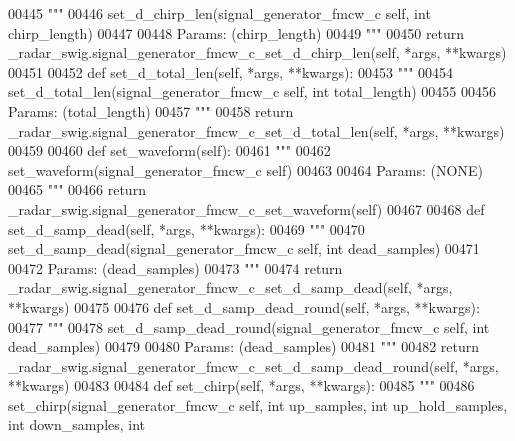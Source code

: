 \begin{DoxyCode}
{{{{00445         \textcolor{stringliteral}{"""}
00446 \textcolor{stringliteral}{        set\_d\_chirp\_len(signal\_generator\_fmcw\_c self, int chirp\_length)}
00447 \textcolor{stringliteral}{}
00448 \textcolor{stringliteral}{        Params: (chirp\_length)}
00449 \textcolor{stringliteral}{        """}
00450         \textcolor{keywordflow}{return} \_radar\_swig.signal\_generator\_fmcw\_c\_set\_d\_chirp\_len(self, *args, **kwargs)
00451 
00452     \textcolor{keyword}{def }set_d_total_len(self, *args, **kwargs):
00453         \textcolor{stringliteral}{"""}
00454 \textcolor{stringliteral}{        set\_d\_total\_len(signal\_generator\_fmcw\_c self, int total\_length)}
00455 \textcolor{stringliteral}{}
00456 \textcolor{stringliteral}{        Params: (total\_length)}
00457 \textcolor{stringliteral}{        """}
00458         \textcolor{keywordflow}{return} \_radar\_swig.signal\_generator\_fmcw\_c\_set\_d\_total\_len(self, *args, **kwargs)
00459 
00460     \textcolor{keyword}{def }set_waveform(self):
00461         \textcolor{stringliteral}{"""}
00462 \textcolor{stringliteral}{        set\_waveform(signal\_generator\_fmcw\_c self)}
00463 \textcolor{stringliteral}{}
00464 \textcolor{stringliteral}{        Params: (NONE)}
00465 \textcolor{stringliteral}{        """}
00466         \textcolor{keywordflow}{return} \_radar\_swig.signal\_generator\_fmcw\_c\_set\_waveform(self)
00467 
00468     \textcolor{keyword}{def }set_d_samp_dead(self, *args, **kwargs):
00469         \textcolor{stringliteral}{"""}
00470 \textcolor{stringliteral}{        set\_d\_samp\_dead(signal\_generator\_fmcw\_c self, int dead\_samples)}
00471 \textcolor{stringliteral}{}
00472 \textcolor{stringliteral}{        Params: (dead\_samples)}
00473 \textcolor{stringliteral}{        """}
00474         \textcolor{keywordflow}{return} \_radar\_swig.signal\_generator\_fmcw\_c\_set\_d\_samp\_dead(self, *args, **kwargs)
00475 
00476     \textcolor{keyword}{def }set_d_samp_dead_round(self, *args, **kwargs):
00477         \textcolor{stringliteral}{"""}
00478 \textcolor{stringliteral}{        set\_d\_samp\_dead\_round(signal\_generator\_fmcw\_c self, int dead\_samples)}
00479 \textcolor{stringliteral}{}
00480 \textcolor{stringliteral}{        Params: (dead\_samples)}
00481 \textcolor{stringliteral}{        """}
00482         \textcolor{keywordflow}{return} \_radar\_swig.signal\_generator\_fmcw\_c\_set\_d\_samp\_dead\_round(self, *args, **kwargs)
00483 
00484     \textcolor{keyword}{def }set_chirp(self, *args, **kwargs):
00485         \textcolor{stringliteral}{"""}
00486 \textcolor{stringliteral}{        set\_chirp(signal\_generator\_fmcw\_c self, int up\_samples, int up\_hold\_samples, int down\_samples, int
}}}}}
\end{DoxyCode}
